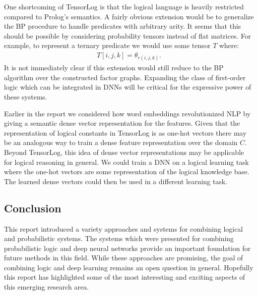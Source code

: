 \documentclass[11pt]{article}
\begin{document}
One shortcoming of TensorLog is that the logical language is heavily restricted compared to Prolog's semantics.  A fairly obvious extension would be to generalize the BP procedure to handle predicates with arbitrary arity.  It seems that this should be possible by considering probability tensors instead of flat matrices.  For example, to represent a ternary predicate we would use some tensor $T$ where:
\begin{gather*}
T[i, j, k] = \theta_{r(i, j, k)}.
\end{gather*}
It is not immediately clear if this extension would still reduce to the BP algorithm over the constructed factor graphs.  Expanding the class of first-order logic which can be integrated in DNNs will be critical for the expressive power of these systems.

Earlier in the report we considered how word embeddings revolutionized NLP by giving a semantic dense vector representation for the features.  Given that the representation of logical constants in TensorLog is as one-hot vectors there may be an analogous way to train a dense feature representation over the domain $C$.  Beyond TensorLog, this idea of dense vector representations may be applicable for logical reasoning in general.  We could train a DNN on a logical learning task where the one-hot vectors are some representation of the logical knowledge base.  The learned dense vectors could then be used in a different learning task.

\subsection{Conclusion}
This report introduced a variety approaches and systems for combining logical and probabilistic systems.  The systems which were presented for combining probabilistic logic and deep neural networks provide an important foundation for future methods in this field.  While these approaches are promising, the goal of combining logic and deep learning remains an open question in general.  Hopefully this report has highlighted some of the most interesting and exciting aspects of this emerging research area.



\end{document}

